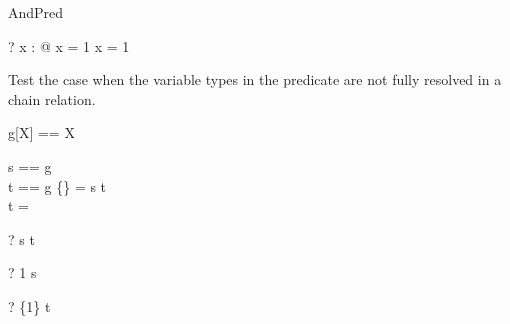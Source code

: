 \begin{zsection}
  \SECTION AndPred
\end{zsection}

\begin{zed}
  \vdash? \exists x : \nat @ x = 1 \land x = 1
\end{zed}

Test the case when the variable types in the predicate are not fully 
resolved in a chain relation.
\begin{zed}
  g[X] == X
\end{zed}

\begin{axdef}
  s == g\\
  t == g
\where
  \{\} = s \in t\\
  t = \power \nat
\end{axdef}

\begin{zed} \vdash? s \in t \end{zed}
\begin{zed} \vdash? 1 \in s \end{zed}
\begin{zed} \vdash? \{1\} \in t \end{zed}

